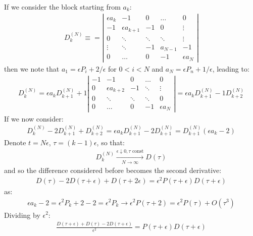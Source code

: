 \documentclass[../template.tex]{subfiles}
\begin{document}
If we consider the block starting from $a_k$:
\begin{align*}
    D_k^{(N)} \equiv = \left|\begin{array}{ccccc}
    \epsilon a_k & -1 & 0 & \dots & 0 \\ 
    -1 & \epsilon a_{k+1} & -1 & 0 & \vdots \\ 
    0 & \ddots & \ddots & \ddots & \vdots \\ 
    \vdots & \ddots & -1 & a_{N-1} & -1 \\ 
    0 & \dots & 0 & -1 & \epsilon a_N
    \end{array}\right|
\end{align*} 
then we note that $a_1 = \epsilon P_i + 2/\epsilon$ for $0<i<N$ and $a_N = \epsilon P_n + 1/\epsilon$, leading to:
\begin{align*}
    D_k^{(N)} = \epsilon a_k D_{k+1}^{(N)} + 1 \left|\begin{array}{ccccc}
    -1 & -1 & 0 & \dots & 0 \\ 
    0 & \epsilon a_{k+2} & -1 & \ddots & \vdots \\ 
    0 & \ddots & \ddots & \ddots & 0 \\ 
    0 & \dots & 0 & -1 & \epsilon a_N 
    \end{array}\right| = \epsilon a_k D^{(N)}_{k+1} -1 D_{k+2}^{(N)}
\end{align*}
If we now consider:
\begin{align*}
    D_k^{(N)} - 2 D_{k+1}^{(N)} + D_{k+2}^{(N)} = \epsilon a_k D_{k+1}^{(N)} - 2 D_{k+1}^{(N)} = D_{k+1}^{(N)} (\epsilon a_k - 2)
\end{align*}
Denote $t = N \epsilon$, $\tau = (k-1)\epsilon$, so that:
\begin{align*}
    D_k^{(N)}  \xrightarrow[N \to \infty]{\epsilon \downarrow 0, \tau \text{ const}} D(\tau)  
\end{align*}  
and so the difference considered before becomes the second derivative:
\begin{align*}
    D(\tau) - 2D(\tau + \epsilon) + D(\tau + 2 \epsilon) = \epsilon^2 P(\tau + \epsilon) D(\tau + \epsilon) 
\end{align*}
as:
\begin{align*}
    \epsilon a_k - 2 = \epsilon^2 P_k + 2 - 2 = \epsilon^2 P_k \to \epsilon^2 P(\tau + 2) = \epsilon^2 P(\tau) + O(\tau^3)
\end{align*}
Dividing by $\epsilon^2$:
\begin{align*}
    \frac{D(\tau + \epsilon) + D(\tau) - 2D(\tau + \epsilon)}{\epsilon^2} = P(\tau + \epsilon) D(\tau + \epsilon) 
\end{align*} 
\end{document}
